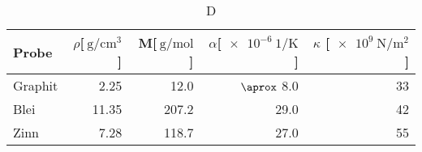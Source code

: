 
\begin{table}[!h]
\begin{center}
\begin{tabular}{|l|r|r|r|r|}
\hline
Probe & $\rho$[$\SI{}{\gram\per\centi\meter^3}$] & M[$\SI{}{\gram\per\mol}$] & $\alpha$[$\SI{e-6}{1\per\kelvin}$] & $\kappa$ [$\SI{e9}{\newton\per\meter^2}$]\\
\hline
\hline
Graphit	& 2.25  & 12.0  & $\aprox$ 8.0  & 33\\
Blei	& 11.35 & 207.2 & 29.0 & 42\\
Zinn	& 7.28  & 118.7 & 27.0 & 55\\
\hline
\end{tabular}
\caption[]{D}
\label{massen}
\end{center}
\end{table}